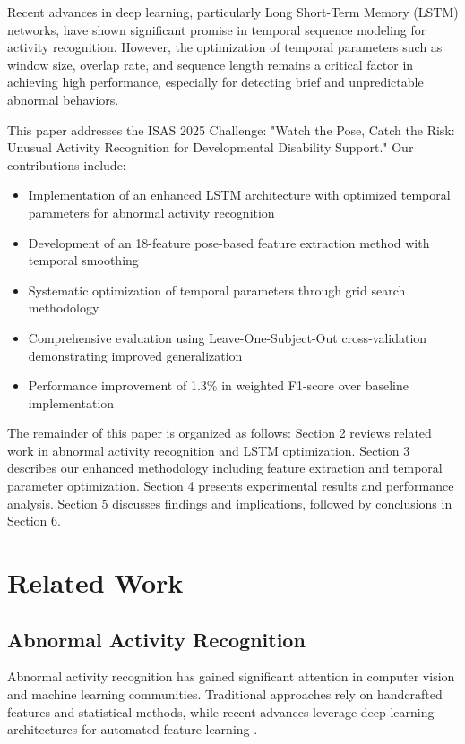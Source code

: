 \documentclass[a4paper,11pt]{article}
\begin{document}
Recent advances in deep learning, particularly Long Short-Term Memory (LSTM) networks, have shown significant promise in temporal sequence modeling for activity recognition. However, the optimization of temporal parameters such as window size, overlap rate, and sequence length remains a critical factor in achieving high performance, especially for detecting brief and unpredictable abnormal behaviors.

This paper addresses the ISAS 2025 Challenge: "Watch the Pose, Catch the Risk: Unusual Activity Recognition for Developmental Disability Support." Our contributions include:

\begin{itemize}
\item Implementation of an enhanced LSTM architecture with optimized temporal parameters for abnormal activity recognition
\item Development of an 18-feature pose-based feature extraction method with temporal smoothing
\item Systematic optimization of temporal parameters through grid search methodology  
\item Comprehensive evaluation using Leave-One-Subject-Out cross-validation demonstrating improved generalization
\item Performance improvement of 1.3\% in weighted F1-score over baseline implementation
\end{itemize}

The remainder of this paper is organized as follows: Section 2 reviews related work in abnormal activity recognition and LSTM optimization. Section 3 describes our enhanced methodology including feature extraction and temporal parameter optimization. Section 4 presents experimental results and performance analysis. Section 5 discusses findings and implications, followed by conclusions in Section 6.

\section{Related Work}

\subsection{Abnormal Activity Recognition}

Abnormal activity recognition has gained significant attention in computer vision and machine learning communities. Traditional approaches rely on handcrafted features and statistical methods, while recent advances leverage deep learning architectures for automated feature learning \cite{morais2019learning}.
\end{document}
